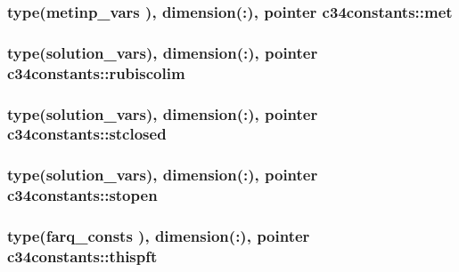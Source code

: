 \subsubsection[{\texorpdfstring{met}{met}}]{\setlength{\rightskip}{0pt plus 5cm}type({\bf metinp\+\_\+vars} ), dimension(\+:), pointer c34constants\+::met}\hypertarget{namespacec34constants_a6d1c98b7c360f24d485be8fc38bdd284}{}\label{namespacec34constants_a6d1c98b7c360f24d485be8fc38bdd284}
\subsubsection[{\texorpdfstring{rubiscolim}{rubiscolim}}]{\setlength{\rightskip}{0pt plus 5cm}type({\bf solution\+\_\+vars}), dimension(\+:), pointer c34constants\+::rubiscolim}\hypertarget{namespacec34constants_a54cb2e4894b639d22e50b457b4208cfc}{}\label{namespacec34constants_a54cb2e4894b639d22e50b457b4208cfc}
\subsubsection[{\texorpdfstring{stclosed}{stclosed}}]{\setlength{\rightskip}{0pt plus 5cm}type({\bf solution\+\_\+vars}), dimension(\+:), pointer c34constants\+::stclosed}\hypertarget{namespacec34constants_a083891d928147a7252ada72b49b240a3}{}\label{namespacec34constants_a083891d928147a7252ada72b49b240a3}
\subsubsection[{\texorpdfstring{stopen}{stopen}}]{\setlength{\rightskip}{0pt plus 5cm}type({\bf solution\+\_\+vars}), dimension(\+:), pointer c34constants\+::stopen}\hypertarget{namespacec34constants_a5affd928720d3a40f01f1198b68b7fb3}{}\label{namespacec34constants_a5affd928720d3a40f01f1198b68b7fb3}
\subsubsection[{\texorpdfstring{thispft}{thispft}}]{\setlength{\rightskip}{0pt plus 5cm}type({\bf farq\+\_\+consts} ), dimension(\+:), pointer c34constants\+::thispft}\hypertarget{namespacec34constants_a4a1314df0becf145f8a2365aa27d992d}{}\label{namespacec34constants_a4a1314df0becf145f8a2365aa27d992d}
